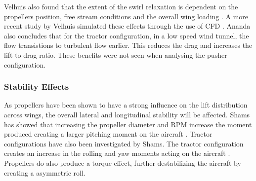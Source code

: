 Velhuis also found that the extent of the swirl relaxation is dependent on the propellers position, free stream conditions and the overall wing loading \cite{Veldhuis2004}. A more recent study by Velhuis simulated these effects through the use of CFD \cite{Veldhuis2016}. Ananda also concludes that for the tractor configuration, in a low speed wind tunnel, the flow transistions to turbulent flow earlier. This reduces the drag and increases the lift to drag ratio. These benefits were not seen when analysing the pusher configuration. 


















\subsubsection{Stability Effects}
As propellers have been shown to have a strong influence on the lift distribution across wings, the overall lateral and longitudinal stability will be affected. Shams has showed that increasing the propeller diameter and RPM increase the moment produced creating a larger pitching moment on the aircraft \cite{Shams2020}. Tractor configurations have also been investigated by Shams. The tractor configuration creates an increase in the rolling and yaw moments acting on the aircraft \cite{Shams2020}. Propellers do also produce a torque effect, further destabilizing the aircraft by creating a asymmetric roll. 

